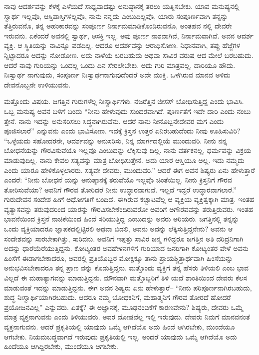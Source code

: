 ನಾವು ಆದರ್ಶವನ್ನು ಕೆಳಕ್ಕೆ ಎಳೆಯದೆ ಸಾಧ್ಯವಾದಷ್ಟು ಅನುಷ್ಠಾನಕ್ಕೆ ತರಲು ಯತ್ನಿಸಬೇಕು. ಯಾವ ಮನುಷ್ಯನಲ್ಲಿ ಸ್ವಾರ್ಥ ಇಲ್ಲವೊ, ಆಸ್ತಿಪಾಸ್ತಿಗಳಿಲ್ಲವೊ, ನಾನು ನನ್ನದು ಎಂಬುದಿಲ್ಲವೊ, ಯಾರು ಸಂಪೂರ್ಣವಾಗಿ ತನ್ನನ್ನು ತೆತ್ತಿರುವನೊ, ತನ್ನ ಅಹಂಕಾರವನ್ನು ಸಂಪೂರ್ಣ ನಿರ್ನಾಮಮಾಡಿಕೊಂಡಿರುವನೊ, ಅಂತಹವ ನಲ್ಲಿ ದೇವರೇ ಇರುವನು. ಏಕೆಂದರೆ ಅವನಲ್ಲಿ ಸ್ವಾರ್ಥ, ಆಸಕ್ತಿ ಇಲ್ಲ. ಅವು ಪೂರ್ಣ ನಾಶವಾಗಿವೆ, ನಿರ್ನಾಮವಾಗಿವೆ. ಅವನ ಆದರ್ಶ ವ್ಯಕ್ತಿ. ಆ ಸ್ಥಿತಿಯನ್ನು ನಾವಿನ್ನೂ ಪಡೆದಿಲ್ಲ. ಆದರೂ ಆದರ್ಶವನ್ನು ಆರಾಧಿಸೋಣ. ನಿಧಾನವಾಗಿ, ತಪ್ಪು ಹೆಜ್ಜೆಗಳ ನ್ನಿಟ್ಟಾದರೂ ಅದನ್ನು ನೋಡೋಣ. ಅದು ನಾಳೆಯೆ ಬರಬಹುದು ಅಥವಾ ಸಾವಿರ ವರುಷ ಆದ ಮೇಲೆ ಬರಬಹುದು. ಆದರೆ ನಾವು ಗುರಿಯನ್ನು ಒಂದಲ್ಲ ಒಂದು ದಿನ ಸೇರಲೇಬೇಕು. ಅದು ಗುರಿ ಮಾತ್ರವಲ್ಲ, ದಾರಿಯೂ ಹೌದು. ನಿಃಸ್ವಾರ್ಥ ನಾಗುವುದು, ಸಂಪೂರ್ಣ ನಿಃಸ್ವಾರ್ಥನಾಗುವುದೆಂದರೆ ಅದೇ ಮುಕ್ತಿ. ಒಳಗಿರುವ ಮಾನವ ಅಳಿದು ದೇವನೊಬ್ಬನೇ ಉಳಿಯುವನು.

ಮತ್ತೊಂದು ವಿಷಯ. ಜಗತ್ತಿನ ಗುರುಗಳೆಲ್ಲ ನಿಃಸ್ವಾರ್ಥಿಗಳು. ನಜರೆತ್ತಿನ ಜೀಸಸ್​ ಬೋಧಿಸುತ್ತಿದ್ದ ಎಂದು ಭಾವಿಸಿ. ಒಬ್ಬ ಮನುಷ್ಯ ಅವನ ಬಳಿಗೆ ಬಂದು “ನೀನು ಹೇಳುವುದು ಸುಂದರವಾಗಿದೆ. ಪೂರ್ಣತೆಗೆ ಇದೇ ದಾರಿ ಎಂದು ನಂಬು ತ್ತೇನೆ. ನಾನು ಇದನ್ನು ಅನುಸರಿಸಲು ಸಿದ್ಧನಾಗಿರುವೆನು. ಆದರೆ ನಾನು ನೀನೊಬ್ಬನೇದೇವರ ಮಗ ಎಂದು ಪೂಜಿಸಲಾರೆ” ಎನ್ನುವನು ಎಂದು ಭಾವಿಸೋಣ. ಇದಕ್ಕೆ ಕ್ರಿಸ್ತನ ಉತ್ತರ ಏನಿರಬಹುದೆಂದು ನೀವು ಊಹಿಸುವಿರಿ? “ಒಳ್ಳೆಯದು ಸಹೋದರನೇ, ಆದರ್ಶವನ್ನು ಅನುಸರಿಸು, ನಿನ್ನ ಮಾರ್ಗದಲ್ಲಿಯೆ ಮುಂದುವರಿ. ನೀನು ನನ್ನ ಬೋಧನೆಯನ್ನು ಗೌರವಿಸುವೆಯೊ ಇಲ್ಲವೊ ಎಂಬುದನ್ನು ಲೆಕ್ಕಿಸುವು ದಿಲ್ಲ. ನಾನು ವರ್ತಕನಲ್ಲ, ಧರ್ಮವನ್ನು ವಿಕ್ರಯ ಮಾಡುವುದಿಲ್ಲ. ನಾನು ಕೇವಲ ಸತ್ಯವನ್ನು ಮಾತ್ರ ಬೋಧಿಸುತ್ತೇನೆ. ಅದು ಯಾರ ಆಸ್ತಿಯೂ ಅಲ್ಲ. ಇದು ನಮ್ಮದು ಎಂದು ಯಾರೂ ಹೇಳಿಕೊಳ್ಳಲಾರರು. ಸತ್ಯವೇ ದೇವರು, ಮುಂದುವರಿ.” ಆದರೆ ಈಗ ಅವನ ಶಿಷ್ಯರು ಏನು ಹೇಳುತ್ತಾರೆ ಎಂದರೆ: “ನೀನು ಬೋಧನೆ ಯನ್ನು ಅನುಷ್ಠಾನಕ್ಕೆ ತರುವೆಯೊ ಇಲ್ಲವೊ ಚಿಂತೆಯಿಲ್ಲ. ನೀನು ಕ್ರಿಸ್ತನಿಗೆ ಗೌರವ ತೋರಿಸುವೆಯಾ? ಅವನಿಗೆ ಗೌರವ ತೋರಿದರೆ ನೀನು ಉದ್ಧಾರವಾಗುವೆ. ಇಲ್ಲದೆ ಇದ್ದರೆ ಉದ್ಧಾರವಾಗಲಾರೆ.” ಗುರುದೇವನ ಸಂದೇಶ ಹೀಗೆ ಅಧೋಗತಿಗೆ ಬಂದಿದೆ. ಈಗಿರುವ ಕಚ್ಚಾಟವೆಲ್ಲ ಆ ವ್ಯಕ್ತಿಯ ವ್ಯಕ್ತಿತ್ವಕ್ಕಾಗಿ ಮಾತ್ರ. ಇಂತಹ ವ್ಯತ್ಯಾಸವನ್ನು ತರುವುದರಿಂದ ಯಾರನ್ನು ಗೌರವಿಸಬೇಕೆಂದಿರುವರೋ ಅವರಿಗೆ ಅಗೌರವವನ್ನು ತರುತ್ತಿರುವರು. ಇಂತಹ ಭಾವನೆಯಿಂದ ಕ್ರಿಸ್ತನೆ ನಾಚಿಕೆಯಿಂದ ಹಿಂದೆ ಸರಿಯುತ್ತಿದ್ದ ಎಂಬುದನ್ನು ಅವರು ಅರಿಯರು. ಜಗತ್ತಿನಲ್ಲಿ ತನ್ನನ್ನು ಒಂದು ವ್ಯಕ್ತಿಯಾದರೂ ಜ್ಞಾಪಕದಲ್ಲಿಟ್ಟಿರಲಿ ಅಥವಾ ಬಿಡಲಿ, ಅವನು ಅದನ್ನು ಲೆಕ್ಕಿಸುತ್ತಿದ್ದನೇನು? ಅವನು ಆ ಸಂದೇಶವನ್ನು ಸಾರಬೇಕಾಗಿತ್ತು, ಸಾರಿದನು. ಅವನಿಗೆ ಇಪ್ಪತ್ತು ಸಾವಿರ ಜನ್ಮ ಗಳಿದ್ದರೂ ಜಗತ್ತಿನ ಅತಿ ದರಿದ್ರನಿಗಾಗಿ ಅದನ್ನು ಧಾರೆಯೆರೆಯುತ್ತಿದ್ದನು. ಕೋಟ್ಯಂತರ ಅವಹೇಳನಗಳಿಗೆ ಗುರಿಯಾದ ಜನರಿಗಾಗಿ ಕೋಟ್ಯಂತರ ವೇಳೆ ಅವನು ಹಿಂಸೆಗೆ ಈಡಾಗಬೇಕಾದರೂ, ಅವರಲ್ಲಿ ಪ್ರತಿಯೊಬ್ಬರ ಮೋಕ್ಷಕ್ಕೂ ತಾನು ಪ್ರಾಯಶ್ಚಿತ್ತಾರ್ಥವಾಗಿ ಹಿಂಸೆಯನ್ನು ಅನುಭವಿಸಬೇಕಾದರೂ ತನ್ನ ಪ್ರಾಣ ವನ್ನು ಕೊಡುತ್ತಿದ್ದನು. ಮತ್ತೊಂದು ವ್ಯಕ್ತಿಗೆ ತನ್ನ ಹೆಸರು ತಿಳಿಯಲಿ ಎಂಬ ಭಾವ ವಿಲ್ಲದೆ ಈ ಮಹಾತ್ಯಾಗವನ್ನು ಮಾಡುತ್ತಿದ್ದನು. ಮೌನವಾಗಿ ಮತ್ತೊಬ್ಬರಿಗೆ ತಿಳಿ ಯದೆ ಶಾಂತಿಯಿಂದ ದೇವರು ಕೆಲಸ ಮಾಡುವಂತೆ ಇದನ್ನು ಮಾಡುತ್ತಿದ್ದನು. ಈಗ ಅವನ ಶಿಷ್ಯರು ಏನು ಹೇಳುತ್ತಾರೆ– “ನೀನು ಪರಿಪೂರ್ಣನಾಗಿರಬಹುದು, ಶುದ್ಧ ನಿಃಸ್ವಾರ್ಥಿಯಾಗಿರಬಹುದು. ಆದರೂ ನಮ್ಮ ಬೋಧಕನಿಗೆ, ಮಹಾತ್ಮನಿಗೆ ಗೌರವ ತೋರದೆ ಹೋದರೆ ಪ್ರಯೋಜನವಿಲ್ಲ” ಎನ್ನುವರು. ಏತಕ್ಕೆ? ಈ ಅಜ್ಞಾನಕ್ಕೆ, ಮೂಢನಂಬಿಕೆಗೆ ಕಾರಣವೇನು? ಶಿಷ್ಯರು, ದೇವರು ಒಮ್ಮೆ ಮಾತ್ರ ವ್ಯಕ್ತನಾಗುವನು ಎಂದು ತಿಳಿಯುವರು. ಅವರ ದೋಷವೆಲ್ಲ ಇಲ್ಲಿ ಇರುವುದು. ದೇವರು ನಿಮಗೆ ಮಾನವನಂತೆ ವ್ಯಕ್ತನಾಗುವನು. ಆದರೆ ಪ್ರಕೃತಿಯಲ್ಲಿ ಯಾವುದು ಒಮ್ಮೆ ಆಗಿದೆಯೊ ಅದು ಹಿಂದೆ ಆಗಿರಬೇಕು, ಮುಂದೆಯೂ ಆಗಬೇಕು. ನಿಯಮಬದ್ಧವಾಗದೆ ಇರುವುದು ಪ್ರಕೃತಿಯಲ್ಲಿ ಇಲ್ಲ. ಅಂದರೆ ಯಾವುದು ಒಮ್ಮೆ ಆಗಿದೆಯೊ ಅದು ಹಿಂದೆಯೂ ಆಗಿದ್ದಿರಬೇಕು, ಮುಂದೆಯೂ ಆಗಬೇಕು.

